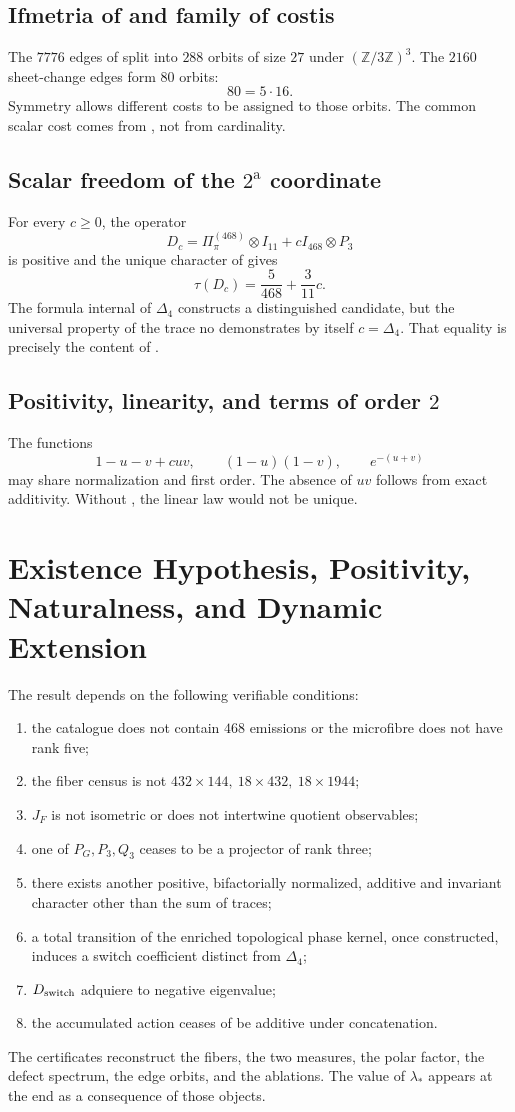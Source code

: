 \subsection{Ifmetria of \texorpdfstring{\Gtr}{Gamma tr} and family of costis}

The \(7776\) edges of \Gtr split into \(288\) orbits of size
\(27\) under \((\mathbb Z/3\mathbb Z)^3\). The \(2160\) sheet-change
edges form \(80\) orbits:
\[
 80=5\cdot16.
\]
Symmetry allows different costs to be assigned to those orbits. The common
scalar cost comes from \HAdd, not from cardinality.

\subsection{Scalar freedom of the \(2^{\mathrm a}\) coordinate}

For every \(c\ge0\), the operator
\[
D_c=\Pi_\pi^{(468)}\otimes I_{11}
+cI_{468}\otimes P_3
\]
is positive and the unique character of \HAdd gives
\[
\tau(D_c)=\frac5{468}+\frac3{11}c.
\]
The formula internal of \(\Delta_4\) constructs a distinguished candidate, but
the universal property of the trace no demonstrates by itself
\(c=\Delta_4\). That equality is precisely the content of \HDef.

\subsection{Positivity, linearity, and terms of order \(2\)}

The functions
\[
 1-u-v+cuv,\qquad(1-u)(1-v),\qquad e^{-(u+v)}
\]
may share normalization and first order. The absence of \(uv\)
follows from exact additivity. Without \HAdd, the linear law would
not be unique.

\section{Existence Hypothesis, Positivity, Naturalness, and Dynamic Extension}

The result depends on the following verifiable conditions:
\begin{enumerate}
  \item the catalogue does not contain \(468\) emissions or the microfibre does not have
  rank five;
  \item the fiber census is not
  \(432\times144,\ 18\times432,\ 18\times1944\);
  \item \(J_F\) is not isometric or does not intertwine quotient observables;
  \item one of \(P_G,P_3,Q_3\) ceases to be a projector of rank three;
  \item there exists another positive, bifactorially normalized, additive and
  invariant character other than the sum of traces;
  \item a total transition of the enriched topological phase kernel, once constructed, induces a
  switch coefficient distinct from \(\Delta_4\);
  \item \(D_{\rm switch}\) adquiere to negative eigenvalue;
  \item the accumulated action ceases of be additive under concatenation.
\end{enumerate}

The certificates reconstruct the fibers, the two measures, the polar factor,
the defect spectrum, the edge orbits, and the ablations. The value of
\(\lambda_*\) appears at the end as a consequence of those objects.
\fi
